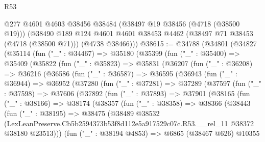 \begin{lexlean}{R53}
\begin{coremodule}
      @277
      @4601
      @4603
      @38456
      @38484
      (@38497 @19 @38456 (@4718 (@38500 @19)))
      (@38490
        @189
        @124
        @4601
        @4601
        @38453
        @4462
        (@38497 @71 @38453 (@4718 (@38500 @71)))
        (@4738 @38466)))
@38615 := @34788
    (@34801
      (@34827
        (@35114
          (fun ("_" : @34467) =>
          @35180
            (@35399
              (fun ("_" : @35400) =>
              @35409
                (@35822
                  (fun ("_" : @35823) =>
                  @35831
                    (@36207
                      (fun ("_" : @36208) =>
                      @36216
                        (@36586
                          (fun ("_" : @36587) =>
                          @36595
                            (@36943
                              (fun ("_" : @36944) =>
                              @36952
                                (@37280
                                  (fun ("_" : @37281) =>
                                  @37289
                                    (@37597
                                      (fun ("_" : @37598) =>
                                      @37606
                                        (@37892
                                          (fun ("_" : @37893) =>
                                          @37901
                                            (@38165
                                              (fun ("_" : @38166) =>
                                              @38174
                                                (@38357
                                                  (fun ("_" : @38358) =>
                                                  @38366
                                                    (@38443
                                                      (fun ("_" : @38195) =>
                                                      @38475
                                                        (@38489
                                                          @38532
                                                          (LexLeanPreserve.Cb5b2594373b53f8d112e5a917529c07c.R53.__rel_11
                                                            @38372
                                                            @38180
                                                            @23513)))
                                                      (fun ("_" : @38194 @4853) =>
                                                      @6865
                                                        (@38467 @626)
                                                        @10355

\end{coremodule}
\end{lexlean}
